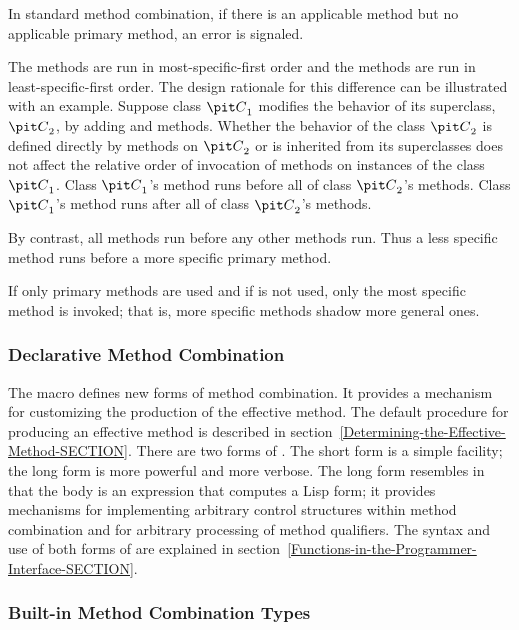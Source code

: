 In standard method combination, if there is an applicable method
but no applicable primary method, an error is signaled.

The  methods are run in most-specific-first order and
the  methods are run in least-specific-first order.  The
design rationale for this difference can be illustrated with an
example.  Suppose class ${\it C} \sub 1$ modifies the behavior of its
superclass, ${\it C} \sub 2$, by adding  and 
methods. Whether the behavior of the class ${\it C}\sub 2$ is defined
directly by methods on ${\it C}\sub 2$ or is inherited from its superclasses
does not affect the relative order of invocation of methods on
instances of the class ${\it C}\sub 1$.  Class ${\it C} \sub 1$'s 
method runs before all of class ${\it C} \sub 2$'s methods.  Class ${\it C} \sub
1$'s  method runs after all of class ${\it C} \sub 2$'s methods.

By contrast, all  methods run before any other methods
run.  Thus a less specific  method runs before a more
specific primary method.

If only primary methods are used and if  is not
used, only the most specific method is invoked; that is, more specific
methods shadow more general ones. 

\subsubsection{Declarative Method Combination}

The macro  defines new forms of method
combination.  It provides a mechanism for customizing the production
of the effective method. The default procedure for producing an
effective method is described in
section~\ref{Determining-the-Effective-Method-SECTION}.
There are two forms of 
.  The short form is a simple facility;
the long form is more powerful and more verbose.  The long form
resembles  in that the body is an expression that
computes a Lisp form; it provides mechanisms for implementing
arbitrary control structures within method combination and for
arbitrary processing of method qualifiers.  The syntax and use of both
forms of  are explained in
section~\ref{Functions-in-the-Programmer-Interface-SECTION}.


\subsubsection{Built-in Method Combination Types}
\label{Built-in-Method-Combination-Types-SECTION}


